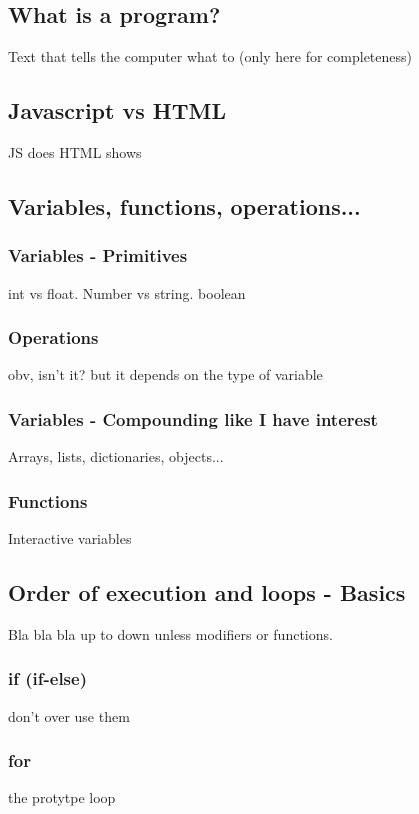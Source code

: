 \subsection{What is a program?} 
\label{sub:program}
Text that tells the computer what to (only here for completeness)

\subsection{Javascript vs HTML}
\label{sub:jsHtml}
JS does
HTML shows

\subsection{Variables, functions, operations...}
\label{sub:types}
    \subsubsection{Variables - Primitives}
    \label{subsub:primitives}
int vs float. Number vs string. boolean
    \subsubsection{Operations}
    \label{subsub:operations}
obv, isn't it? but it depends on the type of variable
    \subsubsection{Variables - Compounding like I have interest} 
    \label{subsub:array}
Arrays, lists, dictionaries, objects...
    \subsubsection{Functions}
    \label{subsub:functions}
Interactive variables

\subsection{Order of execution and loops - Basics}
\label{sub:execBasic}
Bla bla bla up to down unless modifiers or functions.
    \subsubsection{if (if-else)}
    \label{subsub:if}
don't over use them

    \subsubsection{for}
    \label{subsub:for}
the protytpe loop

